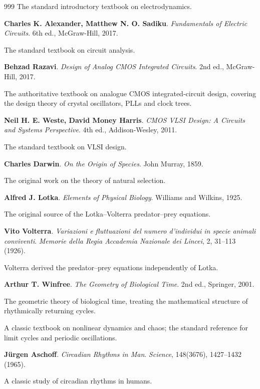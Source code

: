 \begin{thebibliography}{999}
The standard introductory textbook on electrodynamics.

 \textbf{Charles K. Alexander, Matthew N. O. Sadiku}. \textit{Fundamentals of Electric Circuits}. 6th ed., McGraw-Hill, 2017.

The standard textbook on circuit analysis.

 \textbf{Behzad Razavi}. \textit{Design of Analog CMOS Integrated Circuits}. 2nd ed., McGraw-Hill, 2017.

The authoritative textbook on analogue CMOS integrated-circuit design, covering the design theory of crystal oscillators, PLLs and clock trees.

 \textbf{Neil H. E. Weste, David Money Harris}. \textit{CMOS VLSI Design: A Circuits and Systems Perspective}. 4th ed., Addison-Wesley, 2011.

The standard textbook on VLSI design.

 \textbf{Charles Darwin}. \textit{On the Origin of Species}. John Murray, 1859.

The original work on the theory of natural selection.

 \textbf{Alfred J. Lotka}. \textit{Elements of Physical Biology}. Williams and Wilkins, 1925.

The original source of the Lotka--Volterra predator--prey equations.

 \textbf{Vito Volterra}. \textit{Variazioni e fluttuazioni del numero d'individui in specie animali conviventi}. \textit{Memorie della Regia Accademia Nazionale dei Lincei}, 2, 31--113 (1926).

Volterra derived the predator--prey equations independently of Lotka.

 \textbf{Arthur T. Winfree}. \textit{The Geometry of Biological Time}. 2nd ed., Springer, 2001.

The geometric theory of biological time, treating the mathematical structure of rhythmically returning cycles.



A classic textbook on nonlinear dynamics and chaos; the standard reference for limit cycles and periodic oscillations.

 \textbf{J\"urgen Aschoff}. \textit{Circadian Rhythms in Man}. \textit{Science}, 148(3676), 1427--1432 (1965).

A classic study of circadian rhythms in humans.


\end{thebibliography}
